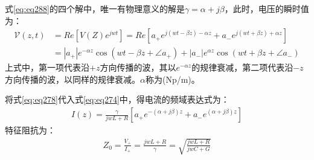 \documentclass{article}
\numberwithin{equation}{section}
\begin{document}
式\ref{eq:eq288}的四个解中，唯一有物理意义的解是$\gamma=\alpha+j\beta$，此时，电压的瞬时值为：
\begin{align}
    \label{eq:eq291}
    \mathcal{V}(z,t)&=Re\left[V(Z)e^{jwt}\right]=Re\left[a_+e^{j(wt-\beta z)-\alpha z}+a_-e^{j(wt+\beta z)+\alpha z}\right] \nonumber \\
                    &=|a_+|e^{-\alpha z}\cos(wt-\beta z+\angle a_+)+|a_-|e^{\alpha z}\cos(wt+\beta z+\angle a_-)
\end{align}
上式中，第一项代表沿$+z$方向传播的波，其以$e^{-\alpha z}$的规律衰减，第二项代表沿$-z$方向传播的波，以同样的规律衰减。$\alpha$称为\textbf{\color{blue}{衰减常数}}(Np/m)。\par
将式\ref{eq:eq278}代入式\ref{eq:eq274}中，得电流的频域表达式为：
\begin{align}
    \label{eq:eq292}
    I(z)=\frac{\gamma}{jwL+R}\left[a_+e^{-(\alpha+j\beta) z}+a_-e^{(\alpha+j\beta) z}\right]
\end{align}
特征阻抗为：
\begin{align}
    \label{eq:eq293}
    Z_0=\frac{V_+}{I_+}=\frac{jwL+R}{\gamma}=\sqrt{\frac{jwL+R}{jwC+G}}
\end{align}
\end{document}
